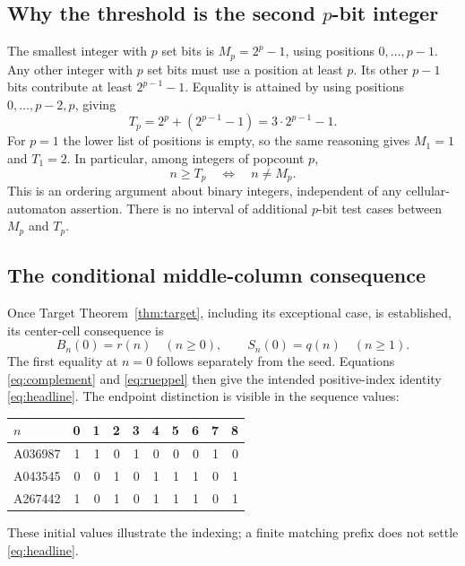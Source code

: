 \documentclass[11pt]{article}
\begin{document}
\subsection{Why the threshold is the second \texorpdfstring{$p$}{p}-bit integer}

The smallest integer with $p$ set bits is $M_p=2^p-1$, using positions
$0,\ldots,p-1$. Any other integer with $p$ set bits must use a position
at least $p$. Its other $p-1$ bits contribute at least $2^{p-1}-1$.
Equality is attained by using positions $0,\ldots,p-2,p$, giving
\[
 T_p=2^p+(2^{p-1}-1)=3\cdot2^{p-1}-1.
\]
For $p=1$ the lower list of positions is empty, so the same reasoning gives
$M_1=1$ and $T_1=2$. In particular, among integers of popcount $p$,
\begin{equation}
 n\geq T_p\quad\Longleftrightarrow\quad n\ne M_p.
 \label{eq:second}
\end{equation}
This is an ordering argument about binary integers, independent of any
cellular-automaton assertion. There is no interval of additional $p$-bit
test cases between $M_p$ and $T_p$.

\subsection{The conditional middle-column consequence}

Once Target Theorem~\ref{thm:target}, including its exceptional case, is
established, its center-cell consequence is
\begin{equation}
 B_n(0)=r(n)\quad(n\geq0),\qquad
 S_n(0)=q(n)\quad(n\geq1).
 \label{eq:center}
\end{equation}
The first equality at $n=0$ follows separately from the seed. Equations
\eqref{eq:complement} and \eqref{eq:rueppel} then give the intended
positive-index identity \eqref{eq:headline}. The endpoint distinction is
visible in the sequence values:
\begin{center}
\begin{tabular}{lrrrrrrrrr}
\toprule
$n$ & 0&1&2&3&4&5&6&7&8\\
\midrule
A036987 & 1&1&0&1&0&0&0&1&0\\
A043545 & 0&0&1&0&1&1&1&0&1\\
A267442 & 1&0&1&0&1&1&1&0&1\\
\bottomrule
\end{tabular}
\end{center}
These initial values illustrate the indexing; a finite matching prefix
does not settle \eqref{eq:headline}.
\end{document}
